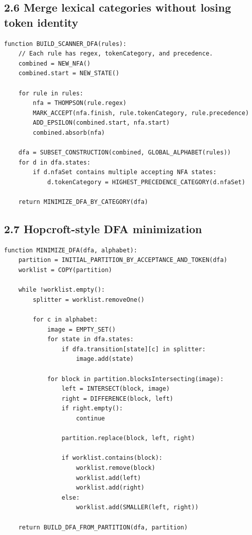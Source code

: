 \documentclass[10pt,letterpaper]{article}
\begin{document}
\subsection*{2.6 Merge lexical categories without losing token identity}
{}

\begin{verbatim}
function BUILD_SCANNER_DFA(rules):
    // Each rule has regex, tokenCategory, and precedence.
    combined = NEW_NFA()
    combined.start = NEW_STATE()

    for rule in rules:
        nfa = THOMPSON(rule.regex)
        MARK_ACCEPT(nfa.finish, rule.tokenCategory, rule.precedence)
        ADD_EPSILON(combined.start, nfa.start)
        combined.absorb(nfa)

    dfa = SUBSET_CONSTRUCTION(combined, GLOBAL_ALPHABET(rules))
    for d in dfa.states:
        if d.nfaSet contains multiple accepting NFA states:
            d.tokenCategory = HIGHEST_PRECEDENCE_CATEGORY(d.nfaSet)

    return MINIMIZE_DFA_BY_CATEGORY(dfa)
\end{verbatim}

\subsection*{2.7 Hopcroft-style DFA minimization}
{}

\begin{verbatim}
function MINIMIZE_DFA(dfa, alphabet):
    partition = INITIAL_PARTITION_BY_ACCEPTANCE_AND_TOKEN(dfa)
    worklist = COPY(partition)

    while !worklist.empty():
        splitter = worklist.removeOne()

        for c in alphabet:
            image = EMPTY_SET()
            for state in dfa.states:
                if dfa.transition[state][c] in splitter:
                    image.add(state)

            for block in partition.blocksIntersecting(image):
                left = INTERSECT(block, image)
                right = DIFFERENCE(block, left)
                if right.empty():
                    continue

                partition.replace(block, left, right)

                if worklist.contains(block):
                    worklist.remove(block)
                    worklist.add(left)
                    worklist.add(right)
                else:
                    worklist.add(SMALLER(left, right))

    return BUILD_DFA_FROM_PARTITION(dfa, partition)
\end{verbatim}
\end{document}
